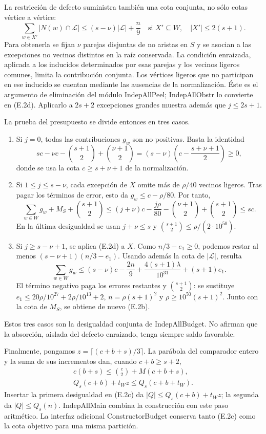 \documentclass[spanish,11pt,a4paper]{article}
\providecommand{\tightlist}{\setlength{\itemsep}{0pt}\setlength{\parskip}{0pt}}
\begin{document}
La restricción de defecto suministra también una cota conjunta, no sólo cotas vértice a vértice: \[
\sum_{w\in X'}|N(w)\cap\mathcal L|
\le (s-\nu)|\mathcal L|+\frac n9
\quad\text{si }X'\subseteq W,\quad |X'|\le2(s+1).
\tag{E.2d}
\] Para obtenerla se fijan \(\nu\) parejas disjuntas de no aristas en \(S\) y se asocian a las excepciones no vecinos distintos en la raíz conservada. La condición enraizada, aplicada a los inducidos determinados por esas parejas y los vecinos ligeros comunes, limita la contribución conjunta. Los vértices ligeros que no participan en ese inducido se cuentan mediante las ausencias de la normalización. Éste es el argumento de eliminación del módulo IndepAllPeel; IndepAllObstr lo convierte en (E.2d). Aplicarlo a \(2s+2\) excepciones grandes muestra además que \(j\le2s+1\).

La prueba del presupuesto se divide entonces en tres casos.

\begin{enumerate}
\def\labelenumi{\arabic{enumi}.}
\tightlist
\item
  Si \(j=0\), todas las contribuciones \(g_w\) son no positivas. Basta la identidad \[
  sc-\nu c-\binom{s+1}2+\binom{\nu+1}2
  =(s-\nu)\left(c-\frac{s+\nu+1}{2}\right)\ge0,
  \] donde se usa la cota \(c\ge s+\nu+1\) de la normalización.
\item
  Si \(1\le j\le s-\nu\), cada excepción de \(X\) omite más de \(\rho/40\) vecinos ligeros. Tras pagar los términos de error, esto da \(g_w\le c-\rho/80\). Por tanto, \[
  \sum_{w\in W}g_w+M_S+\binom{s+1}2
  \le(j+\nu)c-\frac{j\rho}{80}
       -\binom{\nu+1}2+\binom{s+1}2\le sc.
  \] En la última desigualdad se usan \(j+\nu\le s\) y \(\binom{s+1}2\le\rho/(2\cdot10^{50})\).
\item
  Si \(j\ge s-\nu+1\), se aplica (E.2d) a \(X\). Como \(n/3-e_1\ge0\), podemos restar al menos \((s-\nu+1)(n/3-e_1)\). Usando además la cota de \(|\mathcal L|\), resulta \[
  \sum_{w\in W}g_w
  \le (s-\nu)c-\frac{2n}{9}
     +\frac{4(s+1)\lambda}{10^{31}}+(s+1)e_1.
  \] El término negativo paga los errores restantes y \(\binom{s+1}2\): se sustituye \(e_1\le20\rho/10^{27}+2\rho/10^{13}+2\), \(n=\rho(s+1)^2\) y \(\rho\ge10^{50}(s+1)^2\). Junto con la cota de \(M_S\), se obtiene de nuevo (E.2b).
\end{enumerate}

Estos tres casos son la desigualdad conjunta de IndepAllBudget. No afirman que la absorción, aislada del defecto enraizado, tenga siempre saldo favorable.

Finalmente, pongamos \(z=\lceil(c+b+s)/3\rceil\). La parábola del comparador entero y la suma de sus incrementos dan, cuando \(c+b\ge s+2\), \[
\begin{gathered}
c(b+s)\le\binom c2+M(c+b+s),\\
Q_s(c+b)+t_W z\le Q_s(c+b+t_W).
\end{gathered}
\tag{E.2e}
\] Insertar la primera desigualdad en (E.2c) da \(|Q|\le Q_s(c+b)+t_W z\); la segunda da \(|Q|\le Q_s(n)\). IndepAllMain combina la construcción con este paso aritmético. La interfaz adicional ConstructorBudget conserva tanto (E.2c) como la cota objetivo para una misma partición.
\end{document}
